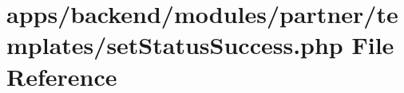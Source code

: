 \hypertarget{partner_2templates_2set_status_success_8php}{\section{apps/backend/modules/partner/templates/set\-Status\-Success.php File Reference}
\label{partner_2templates_2set_status_success_8php}
}
